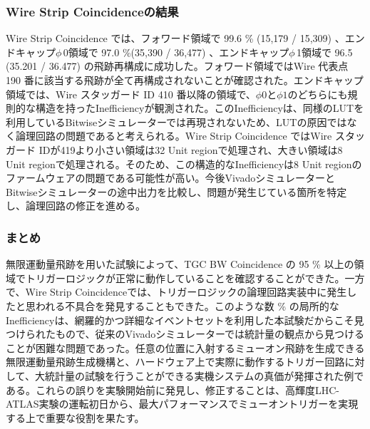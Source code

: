 \subsubsection*{Wire Strip Coincidenceの結果}
Wire Strip Coincidence では、フォワード領域で 99.6 \% (15,179 / 15,309) 、エンドキャップ$\phi\,$0領域で 97.0 \%(35,390 / 36,477) 、エンドキャップ$\phi\,$1領域で 96.5 (35.201 / 36.477) の飛跡再構成に成功した。フォワード領域ではWire 代表点 190 番に該当する飛跡が全て再構成されないことが確認された。エンドキャップ領域では、Wire スタッガード ID 410 番以降の領域で、$\phi0$と$\phi1$のどちらにも規則的な構造を持ったInefficiencyが観測された。このInefficiencyは、同様のLUTを利用しているBitwiseシミュレーターでは再現されないため、LUTの原因ではなく論理回路の問題であると考えられる。Wire Strip Coincidence ではWire スタッガード IDが419より小さい領域は32 Unit regionで処理され、大きい領域は8 Unit regionで処理される。そのため、この構造的なInefficiencyは8 Unit regionのファームウェアの問題である可能性が高い。今後VivadoシミュレーターとBitwiseシミュレーターの途中出力を比較し、問題が発生じている箇所を特定し、論理回路の修正を進める。

\subsubsection*{まとめ}
無限運動量飛跡を用いた試験によって、TGC BW Coincidence の 95 \% 以上の領域でトリガーロジックが正常に動作していることを確認することができた。一方で、Wire Strip Coincidenceでは、トリガーロジックの論理回路実装中に発生したと思われる不具合を発見することもできた。このような数 \% の局所的なInefficiencyは、網羅的かつ詳細なイベントセットを利用した本試験だからこそ見つけられたもので、従来のVivadoシミュレーターでは統計量の観点から見つけることが困難な問題であった。任意の位置に入射するミューオン飛跡を生成できる無限運動量飛跡生成機構と、ハードウェア上で実際に動作するトリガー回路に対して、大統計量の試験を行うことができる実機システムの真価が発揮された例である。これらの誤りを実験開始前に発見し、修正することは、高輝度LHC-ATLAS実験の運転初日から、最大パフォーマンスでミューオントリガーを実現する上で重要な役割を果たす。

